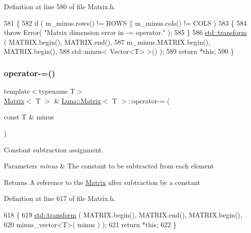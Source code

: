 Definition at line 580 of file Matrix.\+h.


\begin{DoxyCode}
581   \{
582     \textcolor{keywordflow}{if} ( m\_minus.rows() != ROWS || m\_minus.cols() != COLS )
583     \{
584       \textcolor{keywordflow}{throw} Error( \textcolor{stringliteral}{"Matrix dimension error in -= operator."} );
585     \}
586     \hyperlink{namespaceHeat__plot_aeaa6785bedcad63b4bd40e8cb1bad8a0}{std::transform} ( MATRIX.begin(), MATRIX.end(),
587                      m\_minus.MATRIX.begin(), MATRIX.begin(),
588                      std::minus< Vector<T> >() );
589     \textcolor{keywordflow}{return} *\textcolor{keyword}{this};
590   \}
\end{DoxyCode}
\mbox{\label{classLuna_1_1Matrix_a75b4e5e93c8f37c479fd5b89c4309adb}} 
\subsubsection{\texorpdfstring{operator-\/=()}{operator-=()}\hspace{0.1cm}{\footnotesize\ttfamily [2/2]}}
{\footnotesize\ttfamily template$<$typename T$>$ \\
\hyperlink{classLuna_1_1Matrix}{Matrix}$<$ T $>$ \& \hyperlink{classLuna_1_1Matrix}{Luna\+::\+Matrix}$<$ T $>$\+::operator-\/= (\begin{DoxyParamCaption}\item[{const T \&}]{minus }\end{DoxyParamCaption})\hspace{0.3cm}{\ttfamily [inline]}}



Constant subtraction assignment. 


\begin{DoxyParams}{Parameters}
{\em minus} & The constant to be subtracted from each element \\
\hline
\end{DoxyParams}
\begin{DoxyReturn}{Returns}
A reference to the \hyperlink{classLuna_1_1Matrix}{Matrix} after subtraction by a constant 
\end{DoxyReturn}


Definition at line 617 of file Matrix.\+h.


\begin{DoxyCode}
618   \{
619     \hyperlink{namespaceHeat__plot_aeaa6785bedcad63b4bd40e8cb1bad8a0}{std::transform} ( MATRIX.begin(), MATRIX.end(),  MATRIX.begin(),
620                      minus\_vector<T>( minus ) );
621     \textcolor{keywordflow}{return} *\textcolor{keyword}{this};
622   \}
\end{DoxyCode}
\mbox{\label{classLuna_1_1Matrix_a7300d76f84643395a55a879b6d34bcfd}} 
